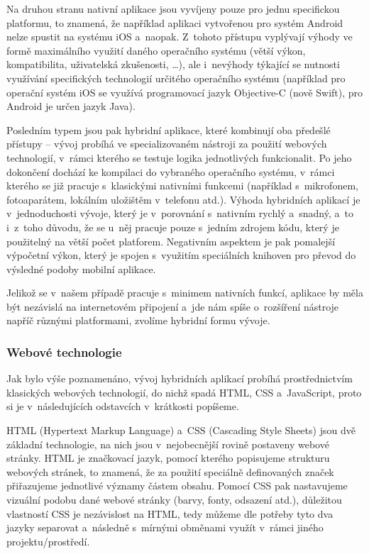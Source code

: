 Na druhou stranu nativní aplikace jsou vyvíjeny pouze pro jednu
specifickou platformu, to znamená, že například aplikaci vytvořenou pro
systém Android nelze spustit na systému iOS a~naopak. Z~tohoto přístupu
vyplývají výhody ve formě maximálního využití daného operačního systému
(větší výkon, kompatibilita, uživatelská zkušenosti, \ldots{}), ale
i~nevýhody týkající se nutnosti využívání specifických technologií
určitého operačního systému (například pro operační systém iOS se
využívá programovací jazyk Objective-C (nově Swift), pro Android je
určen jazyk Java).

Posledním typem jsou pak hybridní aplikace, které kombinují oba předešlé
přístupy -- vývoj probíhá ve specializovaném nástroji za použití
webových technologií, v~rámci kterého se testuje logika jednotlivých
funkcionalit. Po jeho dokončení dochází ke kompilaci do vybraného
operačního systému, v~rámci kterého se již pracuje s~klasickými
nativními funkcemi (například s~mikrofonem, fotoaparátem, lokálním
uložištěm v~telefonu atd.). Výhoda hybridních aplikací je
v~jednoduchosti vývoje, který je v~porovnání s~nativním rychlý a~snadný,
a~to i~z~toho důvodu, že se u~něj pracuje pouze s~jedním zdrojem kódu,
který je použitelný na větší počet platforem. Negativním aspektem je pak
pomalejší výpočetní výkon, který je spojen s~využitím speciálních
knihoven pro převod do výsledné podoby mobilní aplikace.

Jelikož se v~našem případě pracuje s~minimem nativních funkcí, aplikace
by měla být nezávislá na internetovém připojení a~jde nám spíše
o~rozšíření nástroje napříč různými platformami, zvolíme hybridní formu
vývoje.

\hypertarget{webovuxe9-technologie}{%
\subsubsection{Webové technologie}\label{webovuxe9-technologie}}

Jak bylo výše poznamenáno, vývoj hybridních aplikací probíhá
prostřednictvím klasických webových technologií, do nichž spadá HTML,
CSS a~JavaScript, proto si je v~následujících odstavcích v~krátkosti
popíšeme.

HTML (Hypertext Markup Language) a~CSS (Cascading Style Sheets) jsou dvě
základní technologie, na nich jsou v~nejobecnější rovině postaveny
webové stránky. HTML je značkovací jazyk, pomocí kterého popisujeme
strukturu webových stránek, to znamená, že za použití speciálně
definovaných značek přiřazujeme jednotlivé významy částem obsahu. Pomocí
CSS pak nastavujeme vizuální podobu dané webové stránky (barvy, fonty,
odsazení atd.), důležitou vlastností CSS je nezávislost na HTML, tedy
můžeme dle potřeby tyto dva jazyky separovat a~následně s~mírnými
obměnami využít v~rámci jiného projektu/prostředí.~\parencite{htmlcss}

